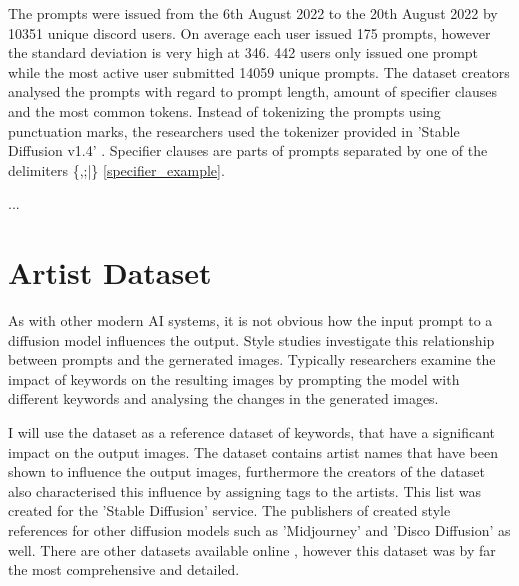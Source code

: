 The prompts were issued from the 6th August 2022 to the 20th August 2022 by 10351 unique discord users. On average each user issued 175 prompts, however the standard deviation is very high at 346. 442 users only issued one prompt while the most active user submitted 14059 unique prompts. 
The dataset creators \autocite{poloclub-diffusiondb} analysed the prompts with regard to prompt length, amount of specifier clauses and the most common tokens. Instead of tokenizing the prompts using punctuation marks, the researchers used the tokenizer provided in 'Stable Diffusion v1.4' \autocite{sd}. Specifier clauses are parts of prompts separated by one of the delimiters \{,;|\} \ref{specifier_example}. 




...

\section{Artist Dataset}

As with other modern AI systems, it is not obvious how the input prompt to a diffusion model influences the output. Style studies investigate this relationship between prompts and the gernerated images. Typically researchers examine the impact of keywords on the resulting images by prompting the model with different keywords and analysing the changes in the generated images.

I will use the dataset \autocite{thelist} as a reference dataset of keywords, that have a significant impact on the output images. The dataset contains artist names that have been shown to influence the output images, furthermore the creators of the dataset also characterised this influence by assigning tags to the artists. This list was created for the 'Stable Diffusion' service. The publishers of \autocite{thelist} created style references for other diffusion models such as 'Midjourney' and 'Disco Diffusion' as well.
There are other datasets available online \autocite{sd-fr}, however this dataset was by far the most comprehensive and detailed. 


